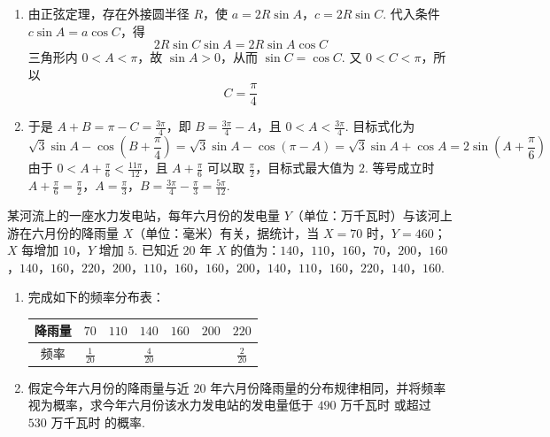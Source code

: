 \begin{solution}
\begin{enumerate}
\item
由正弦定理，存在外接圆半径 \(R\)，使
\(a=2R\sin A\)，\(c=2R\sin C\).
代入条件 \(c\sin A=a\cos C\)，得
\[
2R\sin C\sin A=2R\sin A\cos C
\]
三角形内 \(0<A<\pi\)，故 \(\sin A>0\)，从而
\(\sin C=\cos C\). 又 \(0<C<\pi\)，所以
\[
C=\frac{\pi}{4}
\]

\item
于是 \(A+B=\pi-C=\frac{3\pi}{4}\)，即
\(B=\frac{3\pi}{4}-A\)，且 \(0<A<\frac{3\pi}{4}\). 目标式化为
\[
\sqrt3\sin A-\cos\left(B+\frac{\pi}{4}\right)
=\sqrt3\sin A-\cos(\pi-A)
=\sqrt3\sin A+\cos A
=2\sin\left(A+\frac{\pi}{6}\right)
\]
由于 \(0<A+\frac{\pi}{6}<\frac{11\pi}{12}\)，且
\(A+\frac{\pi}{6}\) 可以取 \(\frac{\pi}{2}\)，目标式最大值为 \(2\). 等号成立时
\(A+\frac{\pi}{6}=\frac{\pi}{2}\)，\(A=\frac{\pi}{3}\)，\(B=\frac{3\pi}{4}-\frac{\pi}{3}=\frac{5\pi}{12}\).
\end{enumerate}
\end{solution}

\begin{problem}
某河流上的一座水力发电站，每年六月份的发电量 \(Y\)（单位：\(\text{万千瓦时}\)）与该河上游在六月份的降雨量 \(X\)（单位：\(\text{毫米}\)）有关，据统计，当 \(X = 70\) 时，\(Y = 460\)；\(X\) 每增加 \(10\)，\(Y\) 增加 \(5\). 已知近 \(20\) 年 \(X\) 的值为：\(140\)，\(110\)，\(160\)，\(70\)，\(200\)，\(160\)，\(140\)，\(160\)，\(220\)，\(200\)，\(110\)，\(160\)，\(160\)，\(200\)，\(140\)，\(110\)，\(160\)，\(220\)，\(140\)，\(160\).

\begin{enumerate}
\item 完成如下的频率分布表：

\begin{center}
\begin{tabular}{c|cccccc}
降雨量 & \(70\) & \(110\) & \(140\) & \(160\) & \(200\) & \(220\) \\
\hline
频率 & \(\frac{1}{20}\) &\fillinblank{} & \(\frac{4}{20}\) &\fillinblank{} &\fillinblank{} & \(\frac{2}{20}\)
\end{tabular}
\end{center}

\item 假定今年六月份的降雨量与近 \(20\) 年六月份降雨量的分布规律相同，并将频率视为概率，求今年六月份该水力发电站的发电量低于 \(490\text{ 万千瓦时}\) 或超过 \(530\text{ 万千瓦时}\) 的概率.
\end{enumerate}
\end{problem}


